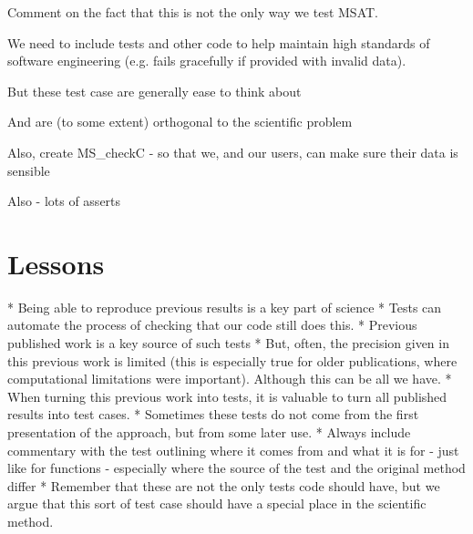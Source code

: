 \documentclass[11pt, oneside]{article}   	%
\begin{document}
Comment on the fact that this is not the only way we test MSAT.

We need to include tests and other code to help maintain high 
standards of software engineering (e.g. fails gracefully if provided 
with invalid data).

But these test case are generally ease to think about

And are (to some extent) orthogonal to the scientific problem

Also, create MS\_checkC - so that we, and our users, can make sure 
their data is sensible

Also - lots of asserts

\section{Lessons}

* Being able to reproduce previous results is a key part of science
* Tests can automate the process of checking that our code still does 
this.
* Previous published work is a key source of such tests
* But, often, the precision given in this previous work is limited (this
is especially true for older publications, where computational limitations 
were important). Although this can be all we have.
* When turning this previous work into tests, it is valuable to turn all
published results into test cases.
* Sometimes these tests do not come from the first presentation of the 
approach, but from some later use.
* Always include commentary with the test outlining where it comes from
and what it is for - just like for functions - especially where the source of the 
test and the original method differ
* Remember that these are not the only tests code should have, but we
argue that this sort of test case should have a special place in the scientific
method.


% 
 
\end{document}
